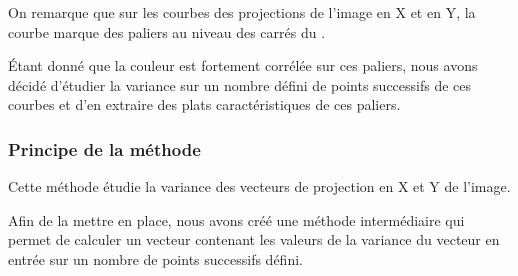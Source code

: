   On remarque que sur les courbes des projections de l'image en X et en Y, la courbe marque des paliers au 
niveau des carrés du \rubic{}. 

  Étant donné que la couleur est fortement corrélée sur ces paliers, nous avons décidé d'étudier la variance sur 
un nombre défini de points successifs de ces courbes et d'en extraire des plats caractéristiques de ces paliers. 

\subsubsection*{Principe de la méthode} 

  Cette méthode étudie la variance des vecteurs de projection en X et Y de l'image. 

Afin de la mettre en place, nous avons créé une méthode intermédiaire qui permet de calculer un vecteur contenant les valeurs de la variance 
du vecteur en entrée sur un nombre de points successifs défini. 

